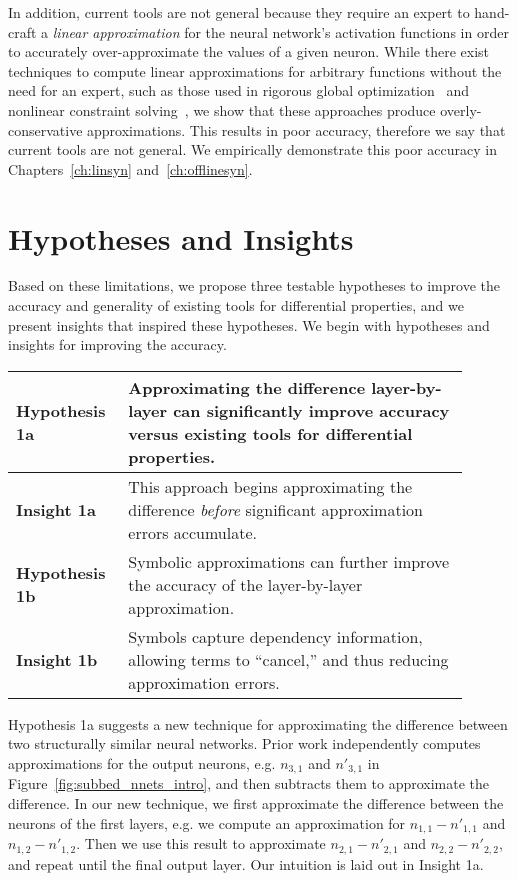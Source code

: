 In addition, current tools are not general because they require an expert to
hand-craft a \textit{linear approximation} for the neural network's activation
functions in order to accurately over-approximate the values of a given neuron.
While there exist techniques to compute linear approximations for arbitrary
functions without the need for an expert, such as those used in rigorous global
optimization~\cite{chabert2009contractor,trombettoni2011inner} and nonlinear
constraint solving~\cite{gao2013dreal}, we
show that these approaches produce overly-conservative approximations. This
results in poor accuracy, therefore we say that current tools are not general. We
empirically demonstrate this poor accuracy in Chapters~\ref{ch:linsyn}
and~\ref{ch:offlinesyn}.


\section{Hypotheses and Insights}
Based on these limitations, we propose three testable hypotheses to improve the
accuracy and generality of existing tools for differential properties, and we
present insights that inspired these hypotheses. We begin with hypotheses and
insights for improving the accuracy.

\begin{table}[h]
	\centering
	\large
	\begin{tabular}{|p{0.2\linewidth}|p{0.7\linewidth}|} \hline
		\textbf{Hypothesis 1a}      &
		Approximating the difference layer-by-layer can significantly improve
		accuracy versus existing tools for differential properties. \\ \hline
		\textbf{Insight 1a}        &
		This approach begins approximating the difference \textit{before}
		significant approximation errors accumulate. \\ \hline
		\textbf{Hypothesis 1b}        &
		Symbolic approximations can further improve the accuracy of the
		layer-by-layer approximation. \\ \hline
		\textbf{Insight 1b}        &
		Symbols capture dependency information, allowing terms to
		``cancel,'' and thus reducing approximation errors. \\ \hline
	\end{tabular}
\end{table}

Hypothesis 1a suggests a new technique for approximating the difference between
two structurally similar neural networks. Prior work independently computes
approximations for the output neurons, e.g. $ n_{3,1} $ and $ n'_{3,1} $ in
Figure~\ref{fig:subbed_nnets_intro}, and then subtracts them to approximate the
difference. In our
new technique, we first approximate the difference between the neurons of the
first layers, e.g. we compute an approximation for $ n_{1,1} - n'_{1,1} $ and $
n_{1,2} - n'_{1,2} $. Then we use this result to approximate $ n_{2,1} - n'_{2,1}
$ and $ n_{2,2} - n'_{2,2} $, and repeat until the final output layer. Our
intuition is laid out in Insight 1a.

